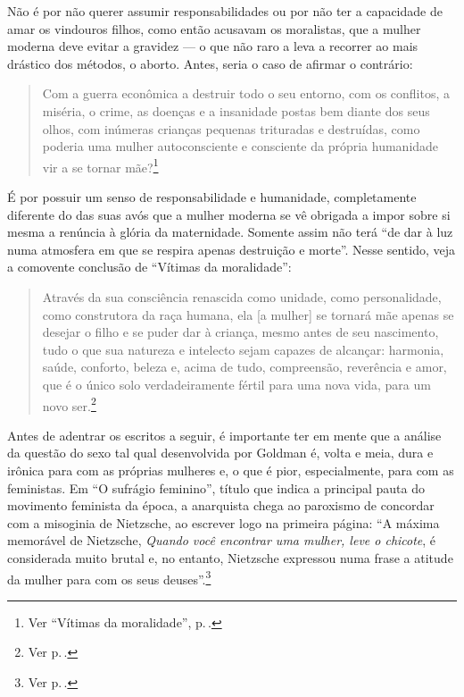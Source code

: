 Não é por não
querer assumir responsabilidades ou por não ter a capacidade de amar os
vindouros filhos, como então acusavam os moralistas, que a mulher
moderna deve evitar a gravidez --- o que não raro a leva a
recorrer ao mais drástico dos métodos, o aborto. Antes, seria o caso de
afirmar o contrário:

\begin{quote}
Com a guerra econômica a destruir todo o seu entorno, com os conflitos,
a miséria, o crime, as doenças e a insanidade postas bem diante dos seus
olhos, com inúmeras crianças pequenas trituradas e destruídas, como
poderia uma mulher autoconsciente e consciente da própria humanidade vir
a se tornar mãe?\footnote{Ver ``Vítimas da moralidade'', p.\,\pageref{entorno}.}
\end{quote}
 
É por possuir um senso de
responsabilidade e humanidade, completamente diferente do das suas avós
que a mulher moderna se vê obrigada a impor sobre si mesma a renúncia à
glória da maternidade. Somente assim não terá ``de dar à luz numa
atmosfera em que se respira apenas destruição e morte''. Nesse
sentido, veja a comovente conclusão de ``Vítimas da moralidade'':

\begin{quote}
Através da sua consciência renascida como unidade, como personalidade,
como construtora da raça humana, ela {[}a mulher{]} se tornará mãe apenas se desejar o
filho e se puder dar à criança, mesmo antes de seu nascimento, tudo o
que sua natureza e intelecto sejam capazes de alcançar: harmonia, saúde,
conforto, beleza e, acima de tudo, compreensão, reverência e amor, que é
o único solo verdadeiramente fértil para uma nova vida, para um novo
ser.\footnote{Ver p.\,\pageref{renascida}.}
\end{quote}


Antes de adentrar os escritos a seguir, é importante ter em mente que a
análise da questão do sexo tal qual desenvolvida por Goldman é,
volta e meia, dura e irônica para com as próprias mulheres e, o que é
pior, especialmente, para com as feministas. Em ``O sufrágio feminino'',
título que indica a principal pauta do movimento feminista da época, a
anarquista chega ao paroxismo de concordar com a misoginia de Nietzsche,
ao escrever logo na primeira página: ``A máxima memorável de Nietzsche, \textit{Quando você encontrar uma mulher, leve o chicote}, é considerada muito brutal e, no entanto, Nietzsche
expressou numa frase a atitude da mulher para com os seus deuses''.\footnote{Ver p.\,\pageref{herege}.}

